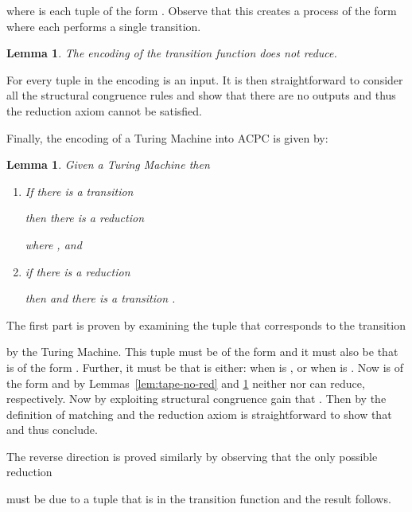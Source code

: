 \documentclass[submission,copyright,creativecommons]{eptcs}
\newtheorem{lemma}[theorem]{Lemma}
\newenvironment{proof}[1][Proof]{\begin{trivlist}
\item[\hskip \labelsep {\bfseries #1}]}{\end{trivlist}}
\begin{document}
where  is each tuple of the form .
Observe that this creates a process of the form  where each
 performs a single transition.

\begin{lemma}
\label{lem:trans-no-red}
The encoding  of the transition function 
does not reduce.
\end{lemma}
\begin{proof}
For every tuple  in  the encoding  is an input.
It is then straightforward to consider all the structural congruence rules
and show that there are no outputs and thus the reduction axiom cannot be satisfied.
\end{proof}

Finally, the encoding  of a Turing Machine into ACPC is given by:


\begin{lemma}
\label{lem:faithful}
Given a Turing Machine 
then
\begin{enumerate}
\item If there is a transition

then there is a reduction

where , and
\item if there is a reduction

then  and
there is a transition
.
\end{enumerate}
\end{lemma}
\begin{proof}
The first part is proven by examining the tuple  that corresponds to the transition 

by the Turing Machine. This tuple must be of the form
 and it must also be that  is of the form
.
Further, it must be that  is either:
 when  is , or
 when  is .
Now 
is of the form
 and
by Lemmas~\ref{lem:tape-no-red} and \ref{lem:trans-no-red} neither 
nor  can reduce, respectively.
Now by exploiting structural congruence gain that
.
Then by the definition of matching and the reduction axiom is straightforward to show that
 and thus conclude.

The reverse direction is proved similarly by observing that the only possible reduction

must be due to a tuple  that is in the transition function 
and the result follows.
\end{proof}
\end{document}
